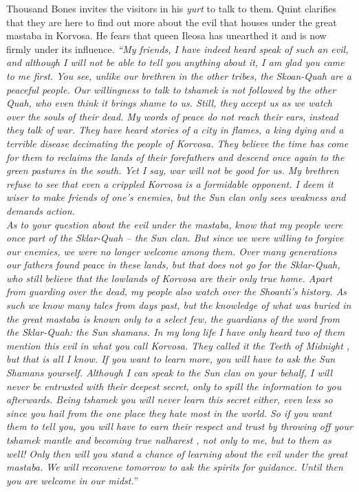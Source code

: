 Thousand Bones invites the visitors in his {\itshape yurt} to talk to them. Quint clarifies that they are here to find out more about the evil that houses under the great mastaba in Korvosa. He fears that queen Ileosa has unearthed it and is now firmly under its influence. {\itshape``My friends, I have indeed heard speak of such an evil, and although I will not be able to tell you anything about it, I am glad you came to me first. You see, unlike our brethren in the other tribes, the Skoan-Quah are a peaceful people. Our willingness to talk to {\itshape tshamek} is not followed by the other Quah, who even think it brings shame to us. Still, they accept us as we watch over the souls of their dead. My words of peace do not reach their ears, instead they talk of war. They have heard stories of a city in flames, a king dying and a terrible disease decimating the people of Korvosa. They believe the time has come for them to reclaims the lands of their forefathers and descend once again to the green pastures in the south. Yet I say, war will not be good for us. My brethren refuse to see that even a crippled Korvosa is a formidable opponent. I deem it wiser to make friends of one's enemies, but the Sun clan only sees weakness and demands action.\\

As to your question about the evil under the mastaba, know that my people were once part of the Sklar-Quah -- the Sun clan. But since we were willing to forgive our enemies, we were no longer welcome among them. Over many generations our fathers found peace in these lands, but that does not go for the Sklar-Quah, who still believe that the lowlands of Korvosa are their only true home. Apart from guarding over the dead, my people also watch over the Shoanti's history. As such we know many tales from days past, but the knowledge of what was buried in the great mastaba is known only to a select few, the guardians of the word from the Sklar-Quah: the Sun shamans. In my long life I have only heard two of them mention this evil in what you call Korvosa. They called it {\itshape the Teeth of Midnight} , but that is all I know. If you want to learn more, you will have to ask the Sun Shamans yourself. Although I can speak to the Sun clan on your behalf, I will never be entrusted with their deepest secret, only to spill the information to you afterwards. Being {\itshape tshamek} you will never learn this secret either, even less so since you hail from the one place they hate most in the world. So if you want them to tell you, you will have to earn their respect and trust by throwing off your  {\itshape tshamek} mantle and becoming true  {\itshape nalharest} , not only to me, but to them as well! Only then will you stand a chance of learning about the evil under the great mastaba. We will reconvene tomorrow to ask the spirits for guidance. Until then you are welcome in our midst.}''\\

